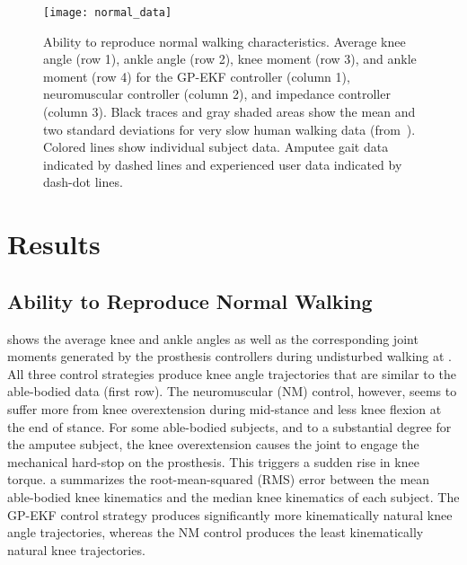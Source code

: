 \begin{figure*}[t]
    \centering
    \texttt{[image: normal\_data]} 
    \caption[Ability to reproduce normal walking characteristics]{Ability to
    reproduce normal walking characteristics. Average knee angle (row 1), ankle
    angle (row 2), knee moment (row 3), and ankle moment (row 4) for the GP-EKF
    controller (column 1), neuromuscular controller (column 2), and impedance
    controller (column 3). Black traces and gray shaded areas show the mean and
    two standard deviations for very slow human walking data
    (from~\citep{bovi2011multiple}). Colored lines show individual subject data.
    Amputee gait data indicated by dashed lines and experienced user data
    indicated by dash-dot lines.}\label{fig:controller_comparison}
\end{figure*}

\section{Results}\label{sec:phase_est_results}
\subsection{Ability to Reproduce Normal Walking}

 shows the average knee and ankle angles as well
as the corresponding joint moments generated by the prosthesis controllers
during undisturbed walking at . All three control strategies
produce knee angle trajectories that are similar to the able-bodied data (first
row). The neuromuscular (NM) control, however, seems to suffer more from knee
overextension during mid-stance and less knee flexion at the end of stance. For
some able-bodied subjects, and to a substantial degree for the amputee subject,
the knee overextension causes the joint to engage the mechanical hard-stop on
the prosthesis. This triggers a sudden rise in knee torque.
a summarizes the root-mean-squared (RMS) error
between the mean able-bodied knee kinematics and the median knee kinematics of
each subject. The GP-EKF control strategy produces significantly more
kinematically natural knee angle trajectories, whereas the NM control produces
the least kinematically natural knee trajectories. 

